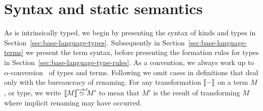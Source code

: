 \documentclass[12pt,phd,lfcs,twoside,openright,logo,leftchapter,normalheadings]{infthesis}
\theoremstyle{plain}
\theoremstyle{definition}
\begin{document}
\section{Syntax and static semantics}
\label{sec:syntax-base-language}

As \BCalc{} is intrinsically typed, we begin by presenting the syntax
of kinds and types in
Section~\ref{sec:base-language-types}. Subsequently in
Section~\ref{sec:base-language-terms} we present the term syntax,
before presenting the formation rules for types in
Section~\ref{sec:base-language-type-rules}. As a convention, we always
work up to $\alpha$-conversion~\cite{Church32} of types and
terms. Following \citet{Pierce02} we omit cases in definitions that
deal only with the bureaucracy of renaming. For any transformation
$\llbracket - \rrbracket$ on a term $M$, or type, we write $\sembr{M} \adef M'$ to
mean that $M'$ is the result of transforming $M$ where implicit
renaming may have occurred.

\end{document}
